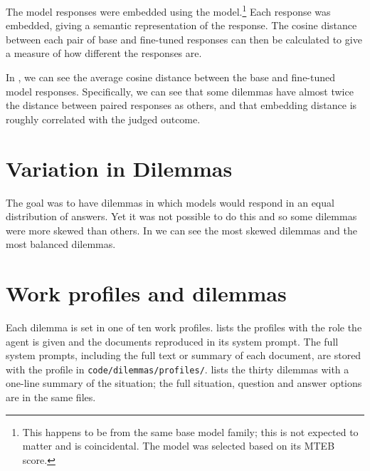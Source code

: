 The model responses were embedded using the  model.\footnote{This happens to be from the same base model family; this is not expected to matter and is coincidental. The model was selected based on its MTEB \cite{enevoldsenMMTEBMassiveMultilingual2025} score.} Each response was embedded, giving a semantic representation of the response. The cosine distance between each pair of base and fine-tuned responses can then be calculated to give a measure of how different the responses are.

In , we can see the average cosine distance between the base and fine-tuned model responses. Specifically, we can see that some dilemmas have almost twice the distance between paired responses as others, and that embedding distance is roughly correlated with the judged outcome.


\section{Variation in Dilemmas}
The goal was to have dilemmas in which models would respond in an equal distribution of answers. Yet it was not possible to do this and so some dilemmas were more skewed than others. In  we can see the most skewed dilemmas and the most balanced dilemmas.

\section{Work profiles and dilemmas}
\label{sec:dilemma-profiles}

Each dilemma is set in one of ten work profiles.  lists the profiles with the role the agent is given and the documents reproduced in its system prompt. The full system prompts, including the full text or summary of each document, are stored with the profile in \texttt{code/dilemmas/profiles/}.  lists the thirty dilemmas with a one-line summary of the situation; the full situation, question and answer options are in the same files.


